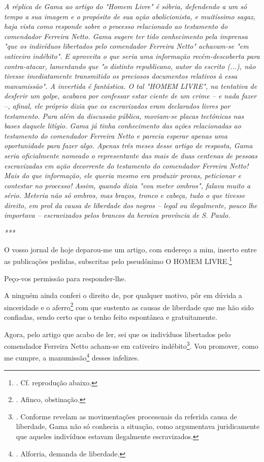 \emph{A réplica de Gama ao artigo do "Homem Livre" é sóbria, defendendo
a um só tempo a sua imagem e o propósito de sua ação abolicionista, e
muitíssimo sagaz, haja vista como responde sobre o processo relacionado
ao testamento do comendador Ferreira Netto. Gama sugere ter tido
conhecimento pela imprensa "que os indivíduos libertados pelo comendador
Ferreira Netto" achavam-se "em cativeiro indébito". E aproveita o que
seria uma informação recém-descoberta para contra-atacar, lamentando que
"o distinto republicano, autor do escrito (...), não tivesse
imediatamente transmitido os preciosos documentos relativos à essa
manumissão". A invertida é fantástica. O tal "HOMEM LIVRE", na tentativa
de desferir um golpe, acabava por confessar estar ciente de um crime --
e nada fazer --, afinal, ele próprio dizia que os escravizados eram
declarados livres por testamento. Para além da discussão pública,
moviam-se placas tectônicas nas bases daquele litígio. Gama já tinha
conhecimento das ações relacionadas ao testamento do comendador Ferreira
Netto e parecia esperar apenas uma oportunidade para fazer algo. Apenas
três meses desse artigo de resposta, Gama seria oficialmente nomeado o
representante das mais de duas centenas de pessoas escravizadas em ação
decorrente do testamento do comendador Ferreira Netto! Mais do que
informação, ele queria mesmo era produzir provas, peticionar e contestar
no processo! Assim, quando dizia "vou meter ombros", falava muito a
sério. Meteria não só ombros, mas braços, tronco e cabeça, tudo o que
tivesse direito, em prol da causa de liberdade dos negros -- legal ou
ilegalmente, pouco lhe importava -- escravizados pelos brancos da
heroica província de S. Paulo. }

\emph{***}

O vosso jornal de hoje deparou-me um artigo, com endereço a mim, inserto
entre as publicações pedidas, subscritas pelo pseudônimo O HOMEM
LIVRE.\footnote{. Cf. reprodução abaixo.}

Peço-vos permissão para responder-lhe.

A ninguém ainda conferi o direito de, por qualquer motivo, pôr em dúvida
a sinceridade e o aferro\footnote{. Afinco, obstinação.} com que
sustento as causas de liberdade que me hão sido confiadas, sendo certo
que o tenho feito espontânea e gratuitamente.

Agora, pelo artigo que acabo de ler, sei que os indivíduos libertados
pelo comendador Ferreira Netto acham-se em cativeiro indébito\footnote{.
  Conforme revelam as movimentações processuais da referida causa de
  liberdade, Gama não só conhecia a situação, como argumentava
  juridicamente que aqueles indivíduos estavam ilegalmente escravizados.}.
Vou promover, como me cumpre, a manumissão\footnote{. Alforria, demanda
  de liberdade.} desses infelizes.

